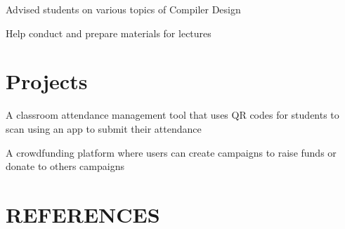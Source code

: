 \documentclass[]{deedy-resume-openfont}
\begin{document}
\begin{minipage}[t]{0.66\textwidth}
	\begin{tightemize}
		\item Advised students on various topics of Compiler Design
		\item Help conduct and prepare materials for lectures
	\end{tightemize}
	\sectionsep


	\section{Projects}
	\begin{tightemize}
		\item A classroom attendance management tool that uses QR codes for students to scan using an app to submit their attendance
	\end{tightemize}
	\sectionsep

	\begin{tightemize}
		\item A crowdfunding platform where users can create campaigns to raise funds or donate to others campaigns
	\end{tightemize}
	\sectionsep


	\section{REFERENCES}

	\begin{tabularx}{\textwidth}{p{}|p{}}

\end{tabularx}
\end{minipage}
\end{document}
